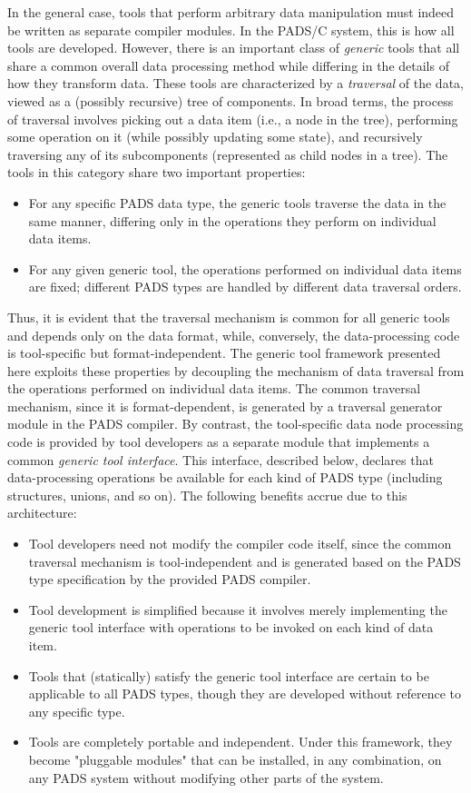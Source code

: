 In the general case, tools that perform arbitrary data manipulation must indeed be written as separate compiler modules. In the PADS/C system, this is how all tools are developed. However, there is an important class of \emph{generic} tools that all share a common overall data processing method while differing in the details of how they transform data. These tools are characterized by a \emph{traversal} of the data, viewed as a (possibly recursive) tree of components. In broad terms, the process of traversal involves picking out a data item (i.e., a node in the tree), performing some operation on it (while possibly updating some state), and recursively traversing any of its subcomponents (represented as child nodes in a tree). The tools in this category share two important properties:
\begin{itemize}
\item For any specific PADS data type, the generic tools traverse the data in the same manner, differing only in the operations they perform on individual data items.
\item For any given generic tool, the operations performed on individual data items are fixed; different PADS types are handled by different data traversal orders.
\end{itemize}

Thus, it is evident that the traversal mechanism is common for all generic tools and depends only on the data format, while, conversely, the data-processing code is tool-specific but format-independent. The generic tool framework presented here exploits these properties by decoupling the mechanism of data traversal from the operations performed on individual data items. The common traversal mechanism, since it is format-dependent, is generated by a traversal generator module in the PADS compiler. By contrast, the tool-specific data node processing code is provided by tool developers as a separate module that implements a common \emph{generic tool interface}. This interface, described below, declares that data-processing operations be available for each kind of PADS type (including structures, unions, and so on). The following benefits accrue due to this architecture:
\begin{itemize}
\item Tool developers need not modify the compiler code itself, since the common traversal mechanism is tool-independent and is generated based on the PADS type specification by the provided PADS compiler.
\item Tool development is simplified because it involves merely implementing the generic tool interface with operations to be invoked on each kind of data item.
\item Tools that (statically) satisfy the generic tool interface are certain to be applicable to all PADS types, though they are developed without reference to any specific type.
\item Tools are completely portable and independent. Under this framework, they become "pluggable modules" that can be installed, in any combination, on any PADS system without modifying other parts of the system.
\end{itemize}

